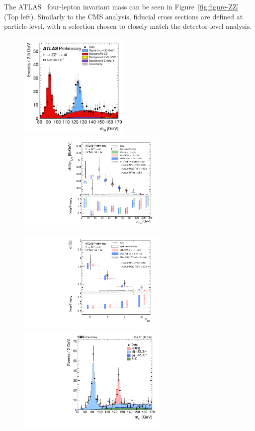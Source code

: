 \documentclass[10pt]{article}
\begin{document}
The ATLAS~\cite{ATLAS-ZZ} four-lepton invariant mass can be seen in
Figure~\ref{fig:figure-ZZ} (Top left). Similarly to the CMS analysis, fiducial
cross sections are defined at particle-level, with a selection chosen
to closely match the detector-level analysis.


\begin{figure}[htb]
\centering
\includegraphics[height=2in]{figures/ATLAS-CONF-2017-032__fig_01__m4l.pdf}
\includegraphics[height=2in]{figures/ATLAS-CONF-2017-032__fig_08a__pT4l.pdf}
\includegraphics[height=2in]{figures/ATLAS-CONF-2017-032__fig_09a__njets.pdf}\\
\includegraphics[height=2in]{figures/CMS-HIG-16-041__Figure_003-b__m4l.pdf}

\end{figure}
\end{document}
